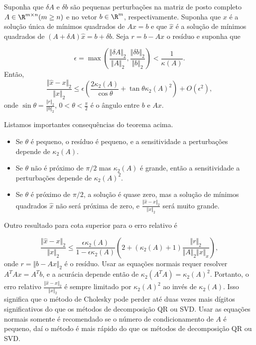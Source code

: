 \documentclass{article}
\begin{document}
\begin{thm}
    Suponha que \(\delta A\) e \(\delta b\) são pequenas perturbações na matriz de posto completo \(A \in \R^{m \times n} (m \geq n)\) e no vetor \(b \in \R^m\), respectivamente. Suponha que \(x\) é a solução única de mínimos quadrados de \(Ax=b\) e que \(\hat{x}\) é a solução de mínimos quadrados de \((A+\delta A)\hat{x} = b + \delta b\). Seja \(r=b-Ax\) o resíduo e suponha que

    \[
        \epsilon = \max \left(\frac{\Vert \delta A \Vert_2}{\Vert A \Vert_2}, \frac{\Vert \delta b \Vert_2}{\Vert b \Vert_2}\right) < \frac{1}{\kappa(A)}.
    \] Então,
    \[
        \frac{\Vert \hat{x} - x \Vert_2}{\Vert x \Vert_2} \leq \epsilon\left(\frac{2\kappa_2(A)}{\cos \theta} + \tan \theta \kappa_2(A)^2\right) + O(\epsilon^2),
    \] onde \(\sin\theta = \frac{\Vert r \Vert_2}{\Vert b \Vert_2}\), \(0 < \theta < \frac{\pi}{2}\) é o ângulo entre \(b\) e \(Ax\).
\end{thm}

Listamos importantes consequências do teorema acima.

\begin{itemize}
    \item Se \(\theta\) é pequeno, o resíduo é pequeno, e a sensitividade a perturbações depende de \(\kappa_2(A)\).
    \item Se \(\theta\) não é próximo de \(\pi/2\) mas \(\kappa_2(A)\) é grande, então a sensitividade a perturbações depende de \(\kappa_2(A)^2\).
    \item Se \(\theta\) é próximo de \(\pi/2\), a solução é quase zero, mas a solução de mínimos quadrados \(\hat{x}\) não será próxima de zero, e \(\frac{\Vert \hat{x} - x \Vert_2}{\Vert x \Vert_2}\) será muito grande.
\end{itemize}

Outro resultado para cota superior para o erro relativo é

\begin{equation}
    \frac{\Vert \hat{x} - x \Vert_2}{\Vert x \Vert_2} \leq \frac{\epsilon \kappa_2(A)}{1-\epsilon \kappa_2(A)}\left(2 + (\kappa_2(A) + 1)\frac{\Vert r \Vert_2}{\Vert A \Vert_2 \Vert x \Vert_x}\right),
\end{equation} onde \(r = \Vert b-Ax \Vert_2\) é o resíduo. Usar as equações normais requer resolver \(A^TAx = A^Tb\), e a acurácia depende então de \(\kappa_2(A^TA) = \kappa_2(A)^2\). Portanto, o erro relativo \(\frac{\Vert \hat{x} - x \Vert_2}{\Vert x \Vert_2}\) é sempre limitado por \(\kappa_2(A)^2\) ao invés de \(\kappa_2(A)\). Isso significa que o método de Cholesky pode perder até duas vezes mais dígitos significativos do que os métodos de decomposição QR ou SVD. Usar as equações normais somente é recomendado se o número de condicionamento de \(A\) é pequeno, daí o método é mais rápido do que os métodos de decomposição QR ou SVD.
\end{document}
